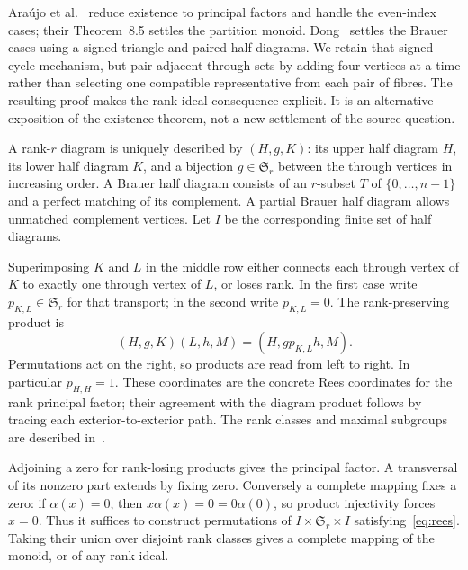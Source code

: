 \documentclass[11pt,a4paper]{article}
\newcommand{\Sym}{\mathfrak S}
\begin{document}
Ara\'ujo et al.~\cite[Theorems~4.4 and~6.2; Corollary~7.6]{ABCHK} reduce existence to principal factors and handle the even-index cases; their Theorem~8.5 settles the partition monoid. Dong~\cite[Sections~4--7]{Dong} settles the Brauer cases using a signed triangle and paired half diagrams. We retain that signed-cycle mechanism, but pair adjacent through sets by adding four vertices at a time rather than selecting one compatible representative from each pair of fibres. The resulting proof makes the rank-ideal consequence explicit. It is an alternative exposition of the existence theorem, not a new settlement of the source question.

A rank-$r$ diagram is uniquely described by $(H,g,K)$: its upper half diagram $H$, its lower half diagram $K$, and a bijection $g\in\Sym_r$ between the through vertices in increasing order. A Brauer half diagram consists of an $r$-subset $T$ of $\{0,\ldots,n-1\}$ and a perfect matching of its complement. A partial Brauer half diagram allows unmatched complement vertices. Let $I$ be the corresponding finite set of half diagrams.

Superimposing $K$ and $L$ in the middle row either connects each through vertex of $K$ to exactly one through vertex of $L$, or loses rank. In the first case write $p_{K,L}\in\Sym_r$ for that transport; in the second write $p_{K,L}=0$. The rank-preserving product is
\begin{equation}\label{eq:rees}
 (H,g,K)(L,h,M)=(H,gp_{K,L}h,M).
\end{equation}
Permutations act on the right, so products are read from left to right. In particular $p_{H,H}=1$. These coordinates are the concrete Rees coordinates for the rank principal factor; their agreement with the diagram product follows by tracing each exterior-to-exterior path. The rank classes and maximal subgroups are described in~\cite[Proposition~2.1 and Remark~2.2(v)--(vii)]{EMRT}.

Adjoining a zero for rank-losing products gives the principal factor. A transversal of its nonzero part extends by fixing zero. Conversely a complete mapping fixes a zero: if $\alpha(x)=0$, then $x\alpha(x)=0=0\alpha(0)$, so product injectivity forces $x=0$. Thus it suffices to construct permutations of $I\times\Sym_r\times I$ satisfying~\eqref{eq:rees}. Taking their union over disjoint rank classes gives a complete mapping of the monoid, or of any rank ideal.
\end{document}
